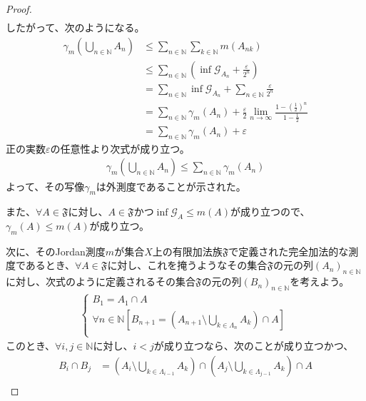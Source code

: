 \documentclass[dvipdfmx]{jsarticle}
\begin{document}
\begin{proof}
\begin{align*}
\end{align*}
したがって、次のようになる。
\begin{align*}
\gamma_{m}\left( \bigcup_{n \in \mathbb{N}} A_{n} \right) &\leq \sum_{n \in \mathbb{N}} {\sum_{k \in \mathbb{N}} {m\left( A_{nk} \right)}}\\
&\leq \sum_{n \in \mathbb{N}} \left( \inf\mathcal{G}_{A_{n}} + \frac{\varepsilon}{2^{n}} \right)\\
&= \sum_{n \in \mathbb{N}} {\inf\mathcal{G}_{A_{n}}} + \sum_{n \in \mathbb{N}} \frac{\varepsilon}{2^{n}}\\
&= \sum_{n \in \mathbb{N}} {\gamma_{m}\left( A_{n} \right)} + \frac{\varepsilon}{2}\lim_{n \rightarrow \infty}\frac{1 - \left( \frac{1}{2} \right)^{n}}{1 - \frac{1}{2}}\\
&= \sum_{n \in \mathbb{N}} {\gamma_{m}\left( A_{n} \right)} + \varepsilon
\end{align*}
正の実数$\varepsilon$の任意性より次式が成り立つ。
\begin{align*}
\gamma_{m}\left( \bigcup_{n \in \mathbb{N}} A_{n} \right) \leq \sum_{n \in \mathbb{N}} {\gamma_{m}\left( A_{n} \right)}
\end{align*}
よって、その写像$\gamma_{m}$は外測度であることが示された。\par
また、$\forall A \in \mathfrak{F}$に対し、$A \in \mathfrak{F}$かつ$\inf\mathcal{G}_{A} \leq m(A)$が成り立つので、$\gamma_{m}(A) \leq m(A)$が成り立つ。\par
次に、そのJordan測度$m$が集合$X$上の有限加法族$\mathfrak{F}$で定義された完全加法的な測度であるとき、$\forall A \in \mathfrak{F}$に対し、これを掩うようなその集合$\mathfrak{F}$の元の列$\left( A_{n} \right)_{n \in \mathbb{N}}$に対し、次式のように定義されるその集合$\mathfrak{F}$の元の列$\left( B_{n} \right)_{n \in \mathbb{N}}$を考えよう。
\begin{align*}
\left\{ \begin{matrix}
B_{1} = A_{1} \cap A \\
\forall n \in \mathbb{N}\left[ B_{n + 1} = \left( A_{n + 1} \setminus \bigcup_{k \in \varLambda_{n}} A_{k} \right) \cap A \right] \\
\end{matrix} \right.\ 
\end{align*}
このとき、$\forall i,j \in \mathbb{N}$に対し、$i < j$が成り立つなら、次のことが成り立つかつ、
\begin{align*}
B_{i} \cap B_{j} &= \left( A_{i} \setminus \bigcup_{k \in \varLambda_{i - 1}} A_{k} \right) \cap \left( A_{j} \setminus \bigcup_{k \in \varLambda_{j - 1}} A_{k} \right) \cap A\\

\end{align*}
\end{proof}
\end{document}
